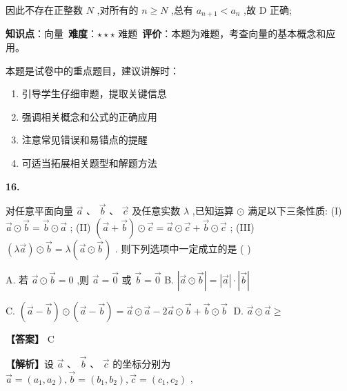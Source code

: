 \documentclass[10pt]{article}
\newenvironment{questionblock}[1]{%
  \needspace{3\baselineskip}%
  \noindent\textbf{#1.}%
}{%
  \par\vspace{1em}%
}
\begin{document}
因此不存在正整数 \(N\) ,对所有的 \(n \geq  N\) ,总有 \({a}_{n + 1} < {a}_{n}\) ,故 D 正确;

\begin{analysisbox}[考点分析]
\textbf{知识点}：向量\
\textbf{难度}：$\star\star\star$ 难题\
\textbf{评价}：本题为难题，考查向量的基本概念和应用。
\end{analysisbox}

\begin{tipbox}[教学提示]
本题是试卷中的重点题目，建议讲解时：
\begin{enumerate}
\item 引导学生仔细审题，提取关键信息
\item 强调相关概念和公式的正确应用
\item 注意常见错误和易错点的提醒
\item 可适当拓展相关题型和解题方法
\end{enumerate}
\end{tipbox}

\begin{questionblock}{16}
对任意平面向量 \(\overrightarrow{a}\text{ 、 }\overrightarrow{b}\text{ 、 }\overrightarrow{c}\) 及任意实数 \(\lambda\) ,已知运算 \(\odot\) 满足以下三条性质: (I) \(\overrightarrow{a} \odot  \overrightarrow{b} = \overrightarrow{b} \odot  \overrightarrow{a}\) ; (II) \(\left( {\overrightarrow{a} + \overrightarrow{b}}\right)  \odot  \overrightarrow{c} = \overrightarrow{a} \odot  \overrightarrow{c} + \overrightarrow{b} \odot  \overrightarrow{c}\) ; (III) \(\left( {\lambda \overrightarrow{a}}\right)  \odot  \overrightarrow{b} = \lambda \left( {\overrightarrow{a} \odot  \overrightarrow{b}}\right)\) . 则下列选项中一定成立的是 ( )

A. 若 \(\overrightarrow{a} \odot  \overrightarrow{b} = 0\) ,则 \(\overrightarrow{a} = \overrightarrow{0}\) 或 \(\overrightarrow{b} = \overrightarrow{0}\) B. \(\left| {\overrightarrow{a} \odot  \overrightarrow{b}}\right|  = \left| \overrightarrow{a}\right|  \cdot  \left| \overrightarrow{b}\right|\)

C. \(\left( {\overrightarrow{a} - \overrightarrow{b}}\right)  \odot  \left( {\overrightarrow{a} - \overrightarrow{b}}\right)  = \overrightarrow{a} \odot  \overrightarrow{a} - 2\overrightarrow{a} \odot  \overrightarrow{b} + \overrightarrow{b} \odot  \overrightarrow{b}\;\) D. \(\overrightarrow{a} \odot  \overrightarrow{a} \geq\)
\end{questionblock}

\textbf{【答案】} C

\textbf{【解析】}设 \(\overrightarrow{a}\text{ 、 }\overrightarrow{b}\text{ 、 }\overrightarrow{c}\) 的坐标分别为 \(\overrightarrow{a} = \left( {{a}_{1},{a}_{2}}\right) ,\overrightarrow{b} = \left( {{b}_{1},{b}_{2}}\right) ,\overrightarrow{c} = \left( {{c}_{1},{c}_{2}}\right)\) ,
\end{document}
